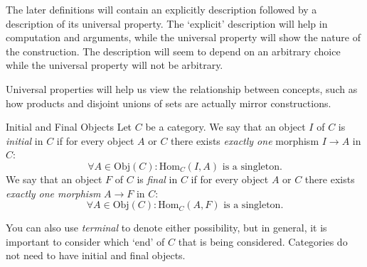\documentclass{report}
\begin{document}
The later definitions will contain an explicitly description followed by a description of its universal property. The `explicit' description will help in computation and arguments, while the universal property will show the nature of the construction. The description will seem to depend on an arbitrary choice while the universal property will not be arbitrary.

Universal properties will help us view the relationship between concepts, such as how products and disjoint unions of sets are actually mirror constructions.

\begin{definition}[\label{def:1.5.1}]{Initial and Final Objects}
    Let $C$ be a category. We say that an object $I$ of $C$ is \textit{initial} in $C$ if for every object $A$ or $C$ there exists \textit{exactly one} morphism $I \rightarrow A$ in $C$:
        \begin{equation*}
            \forall A \in \text{Obj}(C): \text{Hom}_{C}(I, A) \text{ is a singleton}.
        \end{equation*}
    We say that an object $F$ of $C$ is \textit{final} in $C$ if for every object $A$ or $C$ there exists \textit{exactly one morphism} $A \rightarrow F$ in $C$:
        \begin{equation*}
            \forall A \in \text{Obj}(C): \text{Hom}_{C}(A, F) \text{ is a singleton}.
        \end{equation*}
\end{definition}

You can also use \textit{terminal} to denote either possibility, but in general, it is important to consider which `end' of $C$ that is being considered. Categories do not need to have initial and final objects.
\end{document}
